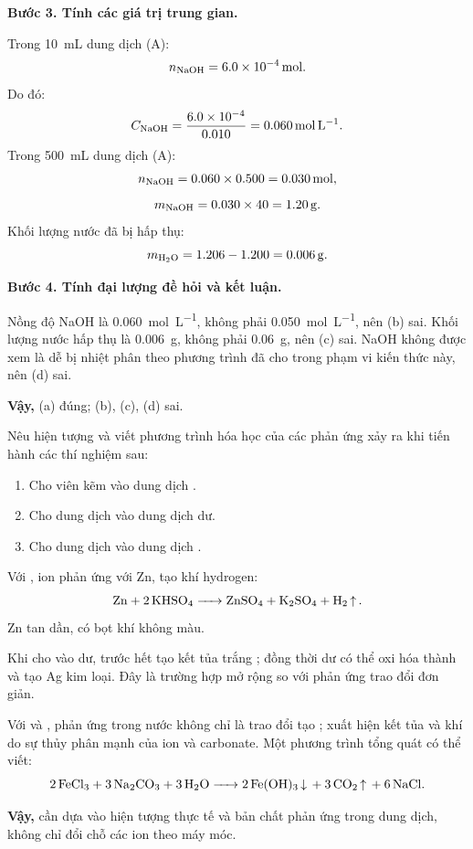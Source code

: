 \begin{tuluyen}
\begin{loigiaiBT}
\textbf{Bước 3. Tính các giá trị trung gian.}

Trong \SI{10}{\milli\liter} dung dịch (A):
\[
n_{\ce{NaOH}}=\SI{6.0e-4}{\mole}.
\]
Do đó:
\[
C_{\ce{NaOH}}=\frac{6.0\times10^{-4}}{0.010}=\SI{0.060}{\mole\per\liter}.
\]
Trong \SI{500}{\milli\liter} dung dịch (A):
\[
n_{\ce{NaOH}}=0.060\times0.500=\SI{0.030}{\mole},
\]
\[
m_{\ce{NaOH}}=0.030\times40=\SI{1.20}{\gram}.
\]
Khối lượng nước đã bị hấp thụ:
\[
m_{\ce{H2O}}=1.206-1.200=\SI{0.006}{\gram}.
\]

\textbf{Bước 4. Tính đại lượng đề hỏi và kết luận.}

Nồng độ NaOH là \SI{0.060}{\mole\per\liter}, không phải \SI{0.050}{\mole\per\liter}, nên (b) sai. Khối lượng nước hấp thụ là \SI{0.006}{\gram}, không phải \SI{0.06}{\gram}, nên (c) sai. NaOH không được xem là dễ bị nhiệt phân theo phương trình đã cho trong phạm vi kiến thức này, nên (d) sai.

\textbf{Vậy,} (a) đúng; (b), (c), (d) sai.
\end{loigiaiBT}
\end{tuluyen}

\begin{tuluyen}
Nêu hiện tượng và viết phương trình hóa học của các phản ứng xảy ra khi tiến hành các thí nghiệm sau:
\begin{enumerate}
\item Cho viên kẽm vào dung dịch .
\item Cho dung dịch  vào dung dịch  dư.
\item Cho dung dịch  vào dung dịch .
\end{enumerate}
\begin{loigiaiBT}
Với , ion  phản ứng với Zn, tạo khí hydrogen:
\[
\ce{Zn + 2KHSO4 -> ZnSO4 + K2SO4 + H2 ^}.
\]
Zn tan dần, có bọt khí không màu.

Khi cho  vào  dư, trước hết tạo kết tủa trắng ; đồng thời  dư có thể oxi hóa  thành  và tạo Ag kim loại. Đây là trường hợp mở rộng so với phản ứng trao đổi đơn giản.

Với  và , phản ứng trong nước không chỉ là trao đổi tạo ; xuất hiện kết tủa  và khí  do sự thủy phân mạnh của ion  và carbonate. Một phương trình tổng quát có thể viết:
\[
\ce{2FeCl3 + 3Na2CO3 + 3H2O -> 2Fe(OH)3 v + 3CO2 ^ + 6NaCl}.
\]

\textbf{Vậy,} cần dựa vào hiện tượng thực tế và bản chất phản ứng trong dung dịch, không chỉ đổi chỗ các ion theo máy móc.
\end{loigiaiBT}
\end{tuluyen}


